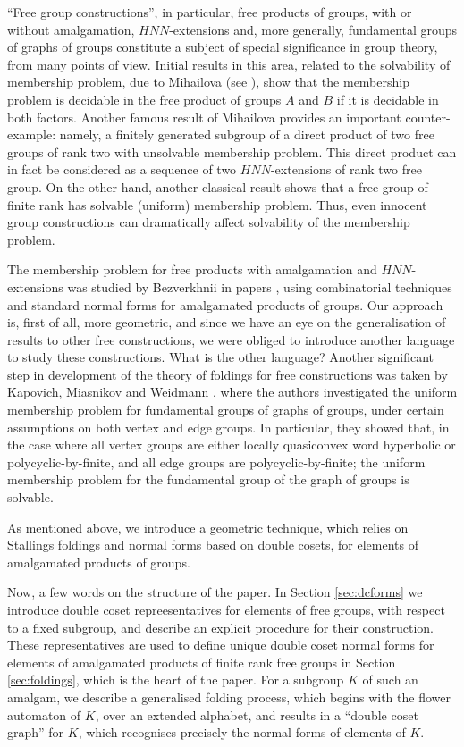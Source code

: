 \documentclass[a4paper,12pt]{article}
\numberwithin{equation}{section}
\numberwithin{figure}{section}
\begin{document}
``Free group constructions'', in particular, free products of groups,
with or without amalgamation, $HNN$-extensions
 and, more generally, fundamental groups
of graphs of groups constitute a subject of special significance in
group theory, from many points of view. Initial results in this area, 
related to the solvability of membership problem,  due to Mihailova (see
\cite{mi59,mi68}), show that the membership problem is
decidable in the free product of groups $A$ and $B$ if it is decidable
in both factors. Another famous result of
Mihailova \cite{mi58}  provides an important counter-example:
 namely,  a finitely generated
subgroup of a direct product of two free groups of rank two with
unsolvable membership problem.  This direct
product can in fact be considered as a sequence of two $HNN$-extensions
of rank two free group. On the other hand, another classical
result \cite[Proposition 2.21]{LS} shows that a free group of finite rank has solvable (uniform)
membership problem. Thus,  even innocent group
constructions can dramatically affect solvability of the membership problem.

The membership problem for free products with amalgamation and
$HNN$-extensions was studied by Bezverkhnii in papers
\cite{bez81,bez86,bez90,bez91}, using  combinatorial
techniques and standard normal forms for  amalgamated products of
groups. Our approach is, first of all, more geometric, and since
we have an eye on the generalisation of results to other free
constructions, we were obliged to introduce another language to
study these constructions. 
{\ajd What is the other language?} 
Another significant step in development of the theory of foldings for  free constructions 
 was taken by Kapovich, Miasnikov and Weidmann 
\cite{KMW03}, where the authors investigated the uniform membership
problem for fundamental groups of graphs of groups, under certain
assumptions on both vertex and edge groups. In particular, they
showed that, in the case where all vertex groups are either locally
quasiconvex word hyperbolic or polycyclic-by-finite, and all edge 
groups are polycyclic-by-finite; the uniform membership problem for the 
fundamental group of the graph of groups is solvable.

As mentioned above, we  introduce a  geometric
technique, which relies on Stallings foldings and 
normal forms based on double cosets, for elements of amalgamated products of
groups. 

Now, a few words on the structure of the paper. In Section
\ref{sec:dcforms} we introduce double coset repreesentatives for
elements of free groups, with respect to a fixed subgroup,  
and  
  describe an explicit procedure
 for their construction. 
These representatives are used to define unique double coset normal forms 
for elements of 
amalgamated products of finite rank free groups in Section  \ref{sec:foldings}, which
 is the heart of the paper. For a subgroup $K$ of such an amalgam, we 
describe a generalised folding process, which begins with the flower automaton
of $K$, over an extended alphabet, and results in  
a ``double coset graph'' for $K$, which  recognises 
precisely the  normal forms of elements of $K$.
\end{document}
